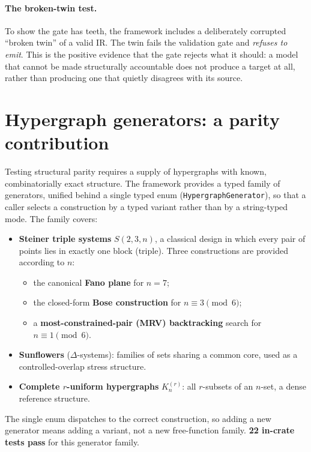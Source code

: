 \documentclass[11pt]{article}
\begin{document}
\paragraph{The broken-twin test.}
To show the gate has teeth, the framework includes a deliberately corrupted
``broken twin'' of a valid IR. The twin fails the validation gate and
\emph{refuses to emit}. This is the positive evidence that the gate rejects what
it should: a model that cannot be made structurally accountable does not produce
a target at all, rather than producing one that quietly disagrees with its source.

\section{Hypergraph generators: a parity contribution}
\label{sec:generators}
Testing structural parity requires a supply of hypergraphs with known,
combinatorially exact structure. The framework provides a typed family of
generators, unified behind a single typed enum
(\texttt{HypergraphGenerator}), so that a caller selects a construction by a
typed variant rather than by a string-typed mode. The family covers:

\begin{itemize}[leftmargin=1.4em]
  \item \textbf{Steiner triple systems} $S(2,3,n)$, a classical design in which
    every pair of points lies in exactly one block (triple). Three constructions
    are provided according to $n$:
    \begin{itemize}[leftmargin=1.4em]
      \item the canonical \textbf{Fano plane} for $n=7$;
      \item the closed-form \textbf{Bose construction} for $n \equiv 3 \pmod 6$;
      \item a \textbf{most-constrained-pair (MRV) backtracking} search for
        $n \equiv 1 \pmod 6$.
    \end{itemize}
  \item \textbf{Sunflowers} ($\Delta$-systems): families of sets sharing a common
    core, used as a controlled-overlap stress structure.
  \item \textbf{Complete $r$-uniform hypergraphs} $K_n^{(r)}$: all $r$-subsets of
    an $n$-set, a dense reference structure.
\end{itemize}

The single enum dispatches to the correct construction, so adding a new
generator means adding a variant, not a new free-function family. \textbf{22
in-crate tests pass} for this generator family.
\end{document}
